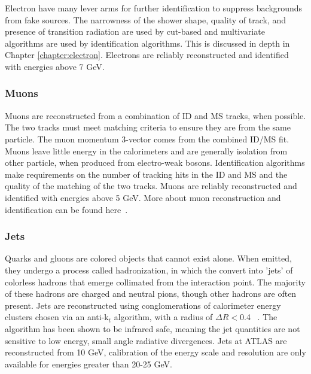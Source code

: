 Electron have many lever arms for further identification to suppress backgrounds from fake sources. The narrowness of the shower shape, quality of track, and presence of transition radiation are used by cut-based and multivariate algorithms are used by identification algorithms. This is discussed in depth in Chapter \ref{chapter:electron}. Electrons are reliably reconstructed and identified with energies above 7 GeV. 

\subsubsection{Muons}

Muons are reconstructed from a combination of ID and MS tracks, when possible. The two tracks must meet matching criteria to ensure they are from the same particle. The muon momentum 3-vector comes from the combined ID/MS fit. Muons leave little energy in the calorimeters and are generally isolation from other particle, when produced from electro-weak bosons. Identification algorithms make requirements on the number of tracking hits in the ID and MS and the quality of the matching of the two tracks. Muons are reliably reconstructed and identified with energies above 5 GeV. More about muon reconstruction and identification can be found here~\cite{MCP2012}.


\subsubsection{Jets}

Quarks and gluons are colored objects that cannot exist alone. When emitted, they undergo a process called hadronization, in which the convert into 'jets' of colorless hadrons that emerge collimated from the interaction point. The majority of these hadrons are charged and neutral pions, though other hadrons are often present. Jets are reconstructed using conglomerations of calorimeter energy clusters chosen via an anti-k$_t$ algorithm, with a radius of $\Delta R <$0.4 ~\cite{Cacciari:2008gp}. The algorithm has been shown to be infrared safe, meaning the jet quantities are not sensitive to low energy, small angle radiative divergences. Jets at ATLAS are reconstructed from 10 GeV, calibration of the energy scale and resolution are only available for energies greater than 20-25 GeV. 

